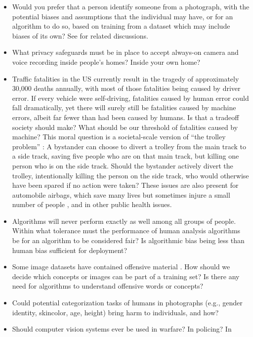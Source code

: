 \begin{itemize}
\item Would you prefer that a person identify someone from a
  photograph, with the potential biases and assumptions that the
  individual may have, or for an algorithm to do so, based on training
  from a dataset which may include biases of its own? See \cite{Kearns2020,Mullainathan2019} for related discussions.
\item What privacy safeguards must be in place to accept always-on
  camera and voice recording inside people's homes?  Inside your own home?
\item Traffic fatalities in the US currently result in the tragedy
  of approximately
  30,000 deaths annually, with most of those fatalities being caused by
  driver error. If every vehicle were self-driving, fatalities caused by human error could fall dramatically, yet there will surely still be fatalities caused by machine errors, albeit far fewer than had been caused by humans.  Is that a tradeoff society should make? What should be our threshold of fatalities caused by machine?
This moral question is a societal-scale
version of ``the trolley problem'' \cite{Thomson1985}:  A bystander can choose to divert a trolley from the main track to a side track, saving five people who are on that main track, but killing one person who is on the side track.  Should the bystander actively divert the trolley, intentionally killing the person on the side track, who would otherwise have been spared if no action were taken?  These issues are also present for automobile airbags, which save many lives but sometimes injure a small number of  people \cite{Dalmotas1995}, and in other public health issues. 
\item 
Algorithms will never perform exactly as well among all groups of
  people. Within what tolerance must the performance of human analysis
  algorithms be for an algorithm to be considered fair?  Is algorithmic bias being less than human bias sufficient for deployment?
\item  Some image datasets have contained offensive material \cite{Birhand2021,Barber2019}. How should we decide which concepts or images can be part of a training set?  Is there any need for algorithms to understand offensive words or concepts?
\item Could potential categorization tasks of humans in photographs  (e.g., gender identity, skincolor,
  age, height) bring
  harm to individuals, and how? 
\item Should computer vision systems ever be used in warfare? In policing? In

\end{itemize}
